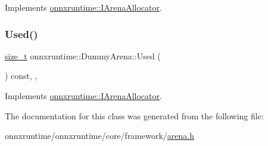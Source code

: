 Implements \mbox{\hyperlink{classonnxruntime_1_1IArenaAllocator_ae39a9a84e17eb83bb779149fb212004a}{onnxruntime\+::\+I\+Arena\+Allocator}}.

\mbox{\label{classonnxruntime_1_1DummyArena_a8d52981f5c7d9c0b098c27405481bc0a}} 
\subsubsection{\texorpdfstring{Used()}{Used()}}
{\footnotesize\ttfamily \mbox{\hyperlink{mlasi_8h_a503efbc1c6e50825320ad909366b78ab}{size\+\_\+t}} onnxruntime\+::\+Dummy\+Arena\+::\+Used (\begin{DoxyParamCaption}{ }\end{DoxyParamCaption}) const\hspace{0.3cm}{\ttfamily [inline]}, {\ttfamily [override]}, {\ttfamily [virtual]}}



Implements \mbox{\hyperlink{classonnxruntime_1_1IArenaAllocator_aa6b6994640f86749998ffd0c5da4dd83}{onnxruntime\+::\+I\+Arena\+Allocator}}.



The documentation for this class was generated from the following file\+:\begin{DoxyCompactItemize}
\item 
onnxruntime/onnxruntime/core/framework/\mbox{\hyperlink{arena_8h}{arena.\+h}}\end{DoxyCompactItemize}
